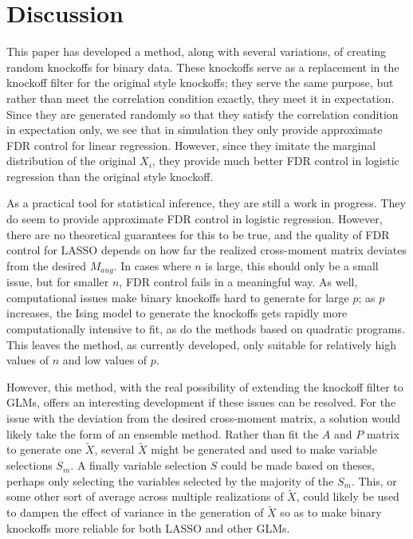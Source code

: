 \documentclass[11pt]{article}
\theoremstyle{definition}
\begin{document}
\section{Discussion}
    This paper has developed a method, along with several variations, of creating random knockoffs for binary data. These knockoffs serve as a replacement in the knockoff filter for the original style knockoffs; they serve the same purpose, but rather than meet the correlation condition exactly, they meet it in expectation. Since they are generated randomly so that they satisfy the correlation condition in expectation only, we see that in simulation they only provide approximate FDR control for linear regression. However, since they imitate the marginal distribution of the original $X_i$, they provide much better FDR control in logistic regression than the original style knockoff. \par
    As a practical tool for statistical inference, they are still a work in progress. They do seem to provide approximate FDR control in logistic regression. However, there are no theoretical guarantees for this to be true, and the quality of FDR control for LASSO depends on how far the realized cross-moment matrix deviates from the desired $M_{aug}$. In cases where $n$ is large, this should only be a small issue, but for smaller $n$, FDR control fails in a meaningful way. As well, computational issues make binary knockoffs hard to generate for large $p$; as $p$ increases, the Ising model to generate the knockoffs gets rapidly more computationally intensive to fit, as do the methods based on quadratic programs. This leaves the method, as currently developed, only suitable for relatively high values of $n$ and low values of $p$. \par
    However, this method, with the real possibility of extending the knockoff filter to GLMs, offers an interesting development if these issues can be resolved. For the issue with the deviation from the desired cross-moment matrix, a solution would likely take the form of an ensemble method. Rather than fit the $A$ and $P$ matrix to generate one $\tilde X$, several $\tilde X$ might be generated and used to make variable selections $S_m$. A finally variable selection $S$ could be made based on theses, perhaps only selecting the variables selected by the majority of the $S_m$. This, or some other sort of average across multiple realizations of $\tilde X$, could likely be used to dampen the effect of variance in the generation of $\tilde X$ so as to make binary knockoffs more reliable for both LASSO and other GLMs. \par
\end{document}
